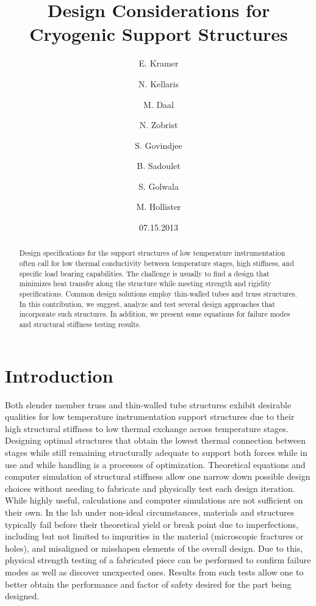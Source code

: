 \documentclass[final]{svjour2}
\begin{document}
\newcommand{\hdblarrow}{H\makebox[0.9ex][l]{$\downdownarrows$}-}
\title{Design Considerations for Cryogenic Support Structures}

\author{E. Kramer \and N. Kellaris  \and M. Daal \and N. Zobrist \and S. Govindjee \and B. Sadoulet \and S. Golwala \and M. Hollister}


\date{07.15.2013}

\maketitle

\begin{abstract}

Design specifications for the support structures of low temperature instrumentation often call for low thermal conductivity between temperature stages, high stiffness, and specific load bearing capabilities.  The challenge is usually to find a design that minimizes heat transfer along the structure while meeting strength and rigidity specifications.  Common design solutions employ thin-walled tubes and truss structures. In this contribution, we suggest, analyze and test several design approaches that incorporate such structures. In addition, we present some equations for failure modes and structural stiffness testing results.


\end{abstract}

\section{Introduction}
Both slender member truss and thin-walled tube structures exhibit desirable qualities for low temperature instrumentation support structures due to their high structural stiffness to low thermal exchange across temperature stages.  Designing optimal structures that obtain the lowest thermal connection between stages while still remaining structurally adequate to support both forces while in use and while handling is a processes of optimization.  Theoretical equations and computer simulation of structural stiffness allow one narrow down possible design choices without needing to fabricate and physically test each design iteration.  While highly useful, calculations and computer simulations are not sufficient on their own. In the lab under non-ideal circumstances, materials and structures typically fail before their theoretical yield or break point due to imperfections, including but not limited to impurities in the material (microscopic fractures or holes), and misaligned or misshapen elements of the overall design.  Due to this, physical strength testing of a fabricated piece can be performed to confirm failure modes as well as discover unexpected ones.  Results from such tests allow one to better obtain the performance and factor of safety desired for the part being designed.
\end{document}
